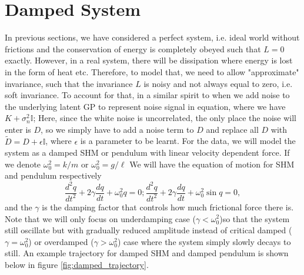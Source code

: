 \documentclass{statsmsc}
\begin{document}
\section{Damped System}
In previous sections, we have considered a perfect system, i.e. ideal world without frictions and the conservation of energy is completely obeyed such that $L=0$ exactly.
However, in a real system, there will be dissipation where energy is lost in the form of heat etc.  
Therefore, to model that, we need to allow "approximate" invariance, such that the invariance $L$ is noisy and not always equal to zero, i.e. soft invariance.
To account for that, in a similar spirit to when we add noise to the underlying latent GP to represent noise signal in equation, where we have $K+\sigma_n^2 \mathbb{I}$;
Here, since the white noise is uncorrelated, the only place the noise will enter is $D$, so we simply have to add a noise term to $D$ and replace all $D$ with $\tilde{D}=D+\epsilon \mathbb{I}$, where $\epsilon$ is a parameter to be learnt. 
For the data, we will model the system as a damped SHM or pendulum with linear velocity dependent force.
If we denote $\omega_0^2=k/m$ or $\omega_0^2=g/\ell$
We will have the equation of motion for SHM and pendulum respectively
$$
\frac{d^2q}{dt^2}+2\gamma\frac{dq}{dt}+\omega_0^2q=0; \frac{d^2q}{dt^2}+2\gamma\frac{dq}{dt}+\omega_0^2\sin q=0 ,
$$
and the $\gamma$ is the damping factor that controls how much frictional force there is. 
Note that we will only focus on underdamping case ($\gamma < \omega_0^2$)so that the system still oscillate but with gradually reduced amplitude instead of critical damped ($\gamma=\omega_0^2$) or overdamped ($\gamma>\omega_0^2$) case where the system simply slowly decays to still.
An example trajectory for damped SHM and damped pendulum is shown below in figure \ref{fig:damped_trajectory}.
\end{document}
